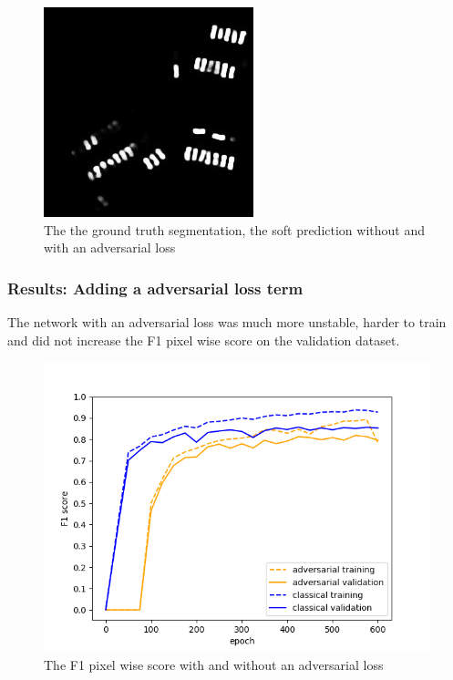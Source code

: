 \documentclass[aspectratio=1610]{beamer}
\begin{document}
\begin{frame}
\begin{figure}[H]
\endminipage\hfill
{}%
  \includegraphics[width=\linewidth]{gan_vs_class/gan_2}
\endminipage
\caption{The the ground truth segmentation, the soft prediction without and with an adversarial loss}
\end{figure}
\end{frame}


\begin{frame}
  \frametitle{\hfill Results: Adding a adversarial loss term}
  The network with an adversarial loss was much more unstable, harder to train and did not increase the F1 pixel wise score on the validation dataset.
\begin{center}
\begin{figure}[H]
      \includegraphics[scale=0.4]{classical_vs_adversarial}
  \caption{The F1 pixel wise score with and without an adversarial loss} \label{fig:gan_vs_class}
\end{figure}
\end{center}
\end{frame}
\end{document}
